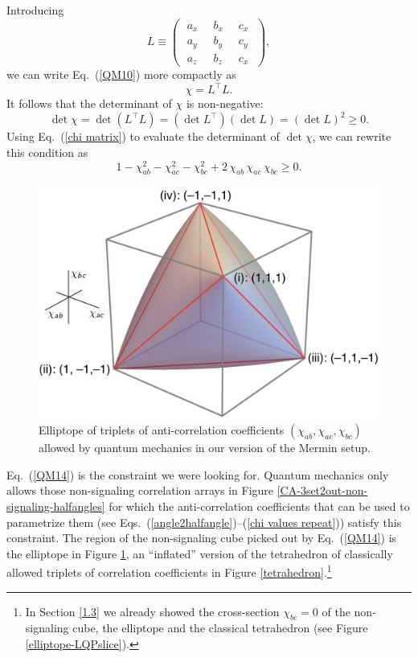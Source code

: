 Introducing
\begin{equation}
L \equiv
\begin{pmatrix}
\; a_x \; & \; b_x \; & \;  c_x \; \\[.2cm]
\; a_y \; & \; b_y \; & \;  c_y \; \\[.2cm]
 \; a_z \; & \; b_z \; & \;  c_x 
\end{pmatrix},
\label{QM11}
\end{equation}
we can write Eq.\ (\ref{QM10}) more compactly as
\begin{equation}
\chi = L^\top L.
\label{QM12}
\end{equation}
It follows that the determinant of $\chi$ is non-negative: 
\begin{equation}
\det{\chi} = \det{\!(L^\top L)} = (\det{L^\top})(\det{L}) = (\det{L})^2 \ge 0. 
\label{QM13}
\end{equation}
Using Eq.\ (\ref{chi matrix}) to evaluate the determinant of $\det{\chi}$, we can rewrite this condition as
\begin{equation}
1 - \chi_{ab}^2 - \chi_{ac}^2 - \chi_{bc}^2 + 2 \, \chi_{ab} \, \chi_{ac} \, \chi_{bc} \ge 0.
\label{QM14}
\end{equation}

\begin{figure}[h]
 \centering
   \includegraphics[width=5in]{elliptope.jpeg} 
   \caption{Elliptope of triplets of anti-correlation coefficients $(\chi_{ab}, \chi_{ac}, \chi_{bc})$ allowed by quantum mechanics in our version of the Mermin setup.}
   \label{elliptope}
\end{figure}

Eq.\ (\ref{QM14}) is the constraint we were looking for. Quantum mechanics only allows those non-signaling correlation arrays in Figure \ref{CA-3set2out-non-signaling-halfangles}  for which the anti-correlation coefficients that can be used to parametrize them (see Eqs.\ (\ref{angle2halfangle})--(\ref{chi values repeat})) satisfy this constraint. The region of the non-signaling cube picked out by Eq.\ (\ref{QM14})  is the elliptope in Figure \ref{elliptope}, an ``inflated'' version of the tetrahedron of classically allowed triplets of correlation coefficients in Figure \ref{tetrahedron}.\footnote{In Section \ref{1.3} we already showed the cross-section $\chi_{bc} = 0$ of the non-signaling cube, the elliptope and the classical tetrahedron (see Figure \ref{elliptope-LQPslice}).} 

